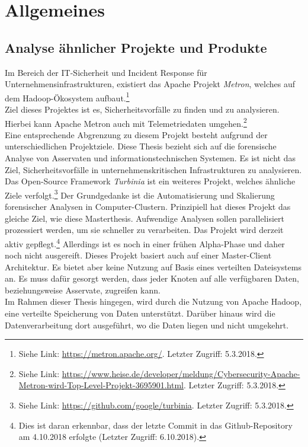 \chapter{Allgemeines}

\section{Analyse ähnlicher Projekte und Produkte}
Im Bereich der IT-Sicherheit und Incident Response für Unternehmensinfrastrukturen, existiert das Apache Projekt \textit{Metron}, welches auf dem Hadoop-Ökosystem aufbaut.\footnote{Siehe Link: \url{https://metron.apache.org/}. Letzter Zugriff: 5.3.2018.}\\ Ziel dieses Projektes ist es, Sicherheitsvorfälle zu finden und zu analysieren. Hierbei kann Apache Metron auch mit Telemetriedaten umgehen.\footnote{Siehe Link: \url{https://www.heise.de/developer/meldung/Cybersecurity-Apache-Metron-wird-Top-Level-Projekt-3695901.html}. Letzter Zugriff: 5.3.2018.}\\
Eine entsprechende Abgrenzung zu diesem Projekt besteht aufgrund der unterschiedlichen Projektziele. Diese Thesis bezieht sich auf die forensische Analyse von Asservaten und informationstechnischen Systemen. Es ist nicht das Ziel, Sicherheitsvorfälle in unternehmenskritischen Infrastrukturen zu analysieren.\\

\noindent
Das Open-Source Framework \textit{Turbinia} ist ein weiteres Projekt, welches ähnliche Ziele verfolgt.\footnote{Siehe Link: \url{https://github.com/google/turbinia}. Letzter Zugriff: 5.3.2018.}
Der Grundgedanke ist die Automatisierung und Skalierung forensischer Analysen in Computer-Clustern. Prinzipiell hat dieses Projekt das gleiche Ziel, wie diese Masterthesis. Aufwendige Analysen sollen parallelisiert prozessiert werden, um sie schneller zu verarbeiten. Das Projekt wird derzeit aktiv gepflegt.\footnote{Dies ist daran erkennbar, dass der letzte Commit in das Github-Repository am 4.10.2018 erfolgte (Letzter Zugriff: 6.10.2018).} 
Allerdings ist es noch in einer frühen Alpha-Phase und daher noch nicht ausgereift. Dieses Projekt basiert auch auf einer Master-Client Architektur. Es bietet aber keine Nutzung auf Basis eines verteilten Dateisystems an. Es muss dafür gesorgt werden, dass jeder Knoten auf alle verfügbaren Daten, beziehungsweise Asservate, zugreifen kann.\\  
Im Rahmen dieser Thesis hingegen, wird durch die Nutzung von Apache Hadoop, eine verteilte Speicherung von Daten unterstützt. Darüber hinaus wird die Datenverarbeitung dort ausgeführt, wo die Daten liegen und nicht umgekehrt. \\

